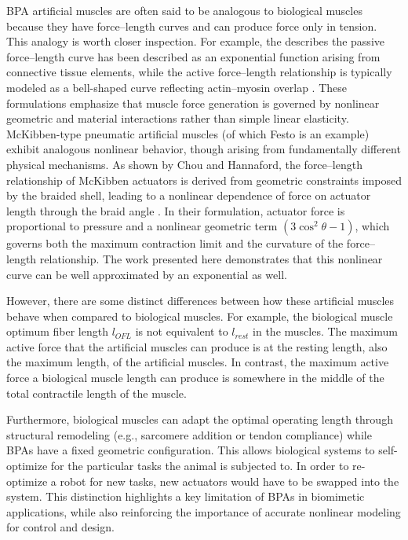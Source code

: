 \documentclass[actuators,article,accept,pdftex,moreauthors]{Definitions/mdpi}
\begin{document}
BPA artificial muscles are often said to be analogous to biological muscles because they have force--length curves and can produce force only in tension. This analogy is worth closer inspection. For example, the describes the passive force–length curve has been described as an exponential function arising from connective tissue elements, while the active force–length relationship is typically modeled as a bell-shaped curve reflecting actin–myosin overlap \citep{winters1990}. These formulations emphasize that muscle force generation is governed by nonlinear geometric and material interactions rather than simple linear elasticity.
McKibben-type pneumatic artificial muscles (of which Festo is an example) exhibit analogous nonlinear behavior, though arising from fundamentally different physical mechanisms. As shown by Chou and Hannaford, the force–length relationship of McKibben actuators is derived from geometric constraints imposed by the braided shell, leading to a nonlinear dependence of force on actuator length through the braid angle \cite{chou_measurement_1996}. In their formulation, actuator force is proportional to pressure and a nonlinear geometric term $(3\cos^2\theta - 1)$, which governs both the maximum contraction limit and the curvature of the force–length relationship. The work presented here demonstrates that this nonlinear curve can be well approximated by an exponential as well.

However, there are some distinct differences between how these artificial muscles behave when compared to biological muscles.
For example, the biological muscle optimum fiber length $l_{OFL}$ is not equivalent to $l_{rest}$ in the muscles. The maximum active force that the artificial muscles can produce is at the resting length, also the maximum length, of the artificial muscles. In contrast, the maximum active force a biological muscle length can produce is somewhere in the middle of the total contractile length of the muscle. 

Furthermore, biological muscles can adapt the optimal operating length through structural remodeling (e.g., sarcomere addition or tendon compliance) while BPAs have a fixed geometric configuration. This allows biological systems to self-optimize for the particular tasks the animal is subjected to. In order to re-optimize a robot for new tasks, new actuators would have to be swapped into the system. This distinction highlights a key limitation of BPAs in biomimetic applications, while also reinforcing the importance of accurate nonlinear modeling for control and design.
\end{document}
